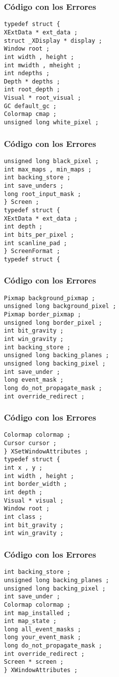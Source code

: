 \documentclass{beamer}
\begin{document}
\begin{frame}[fragile]
\frametitle{C\'odigo con los Errores}
\begin{verbatim}
typedef struct { 
XExtData * ext_data ; 
struct _XDisplay * display ; 
Window root ; 
int width , height ; 
int mwidth , mheight ; 
int ndepths ; 
Depth * depths ; 
int root_depth ; 
Visual * root_visual ; 
GC default_gc ; 
Colormap cmap ; 
unsigned long white_pixel ; 
\end{verbatim}
\end{frame}
\begin{frame}[fragile]
\frametitle{C\'odigo con los Errores}
\begin{verbatim}
unsigned long black_pixel ; 
int max_maps , min_maps ; 
int backing_store ; 
int save_unders ; 
long root_input_mask ; 
} Screen ; 
typedef struct { 
XExtData * ext_data ; 
int depth ; 
int bits_per_pixel ; 
int scanline_pad ; 
} ScreenFormat ; 
typedef struct { 
\end{verbatim}
\end{frame}
\begin{frame}[fragile]
\frametitle{C\'odigo con los Errores}
\begin{verbatim}
Pixmap background_pixmap ; 
unsigned long background_pixel ; 
Pixmap border_pixmap ; 
unsigned long border_pixel ; 
int bit_gravity ; 
int win_gravity ; 
int backing_store ; 
unsigned long backing_planes ; 
unsigned long backing_pixel ; 
int save_under ; 
long event_mask ; 
long do_not_propagate_mask ; 
int override_redirect ; 
\end{verbatim}
\end{frame}
\begin{frame}[fragile]
\frametitle{C\'odigo con los Errores}
\begin{verbatim}
Colormap colormap ; 
Cursor cursor ; 
} XSetWindowAttributes ; 
typedef struct { 
int x , y ; 
int width , height ; 
int border_width ; 
int depth ; 
Visual * visual ; 
Window root ; 
int class ; 
int bit_gravity ; 
int win_gravity ; 
\end{verbatim}
\end{frame}
\begin{frame}[fragile]
\frametitle{C\'odigo con los Errores}
\begin{verbatim}
int backing_store ; 
unsigned long backing_planes ; 
unsigned long backing_pixel ; 
int save_under ; 
Colormap colormap ; 
int map_installed ; 
int map_state ; 
long all_event_masks ; 
long your_event_mask ; 
long do_not_propagate_mask ; 
int override_redirect ; 
Screen * screen ; 
} XWindowAttributes ; 
\end{verbatim}
\end{frame}
\end{document}
